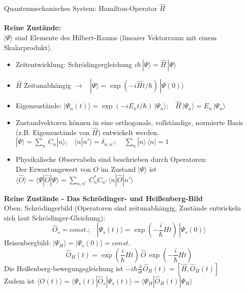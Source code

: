 \documentclass[a4paper,11pt]{scrartcl}
\begin{document}
Quantenmechanisches System: Hamilton-Operator $\hat{H}$\\
\\
\textbf{Reine Zustände:}\\
$| \Psi \rangle$ sind Elemente des Hilbert-Raums (linearer Vektorraum mit einem Skalarprodukt).\\
\begin{itemize}
 \item Zeitentwicklung: Schrödingergleichung $i \hbar \, |\Psi \rangle = \hat{H} \, | \Psi \rangle$
 \item $\hat{H}$ Zeitunabhängig $\rightarrow \,\,\,\,\, | \Psi \rangle = \exp{(-i \hat{H}t/\hbar)} \, | \Psi (0) \rangle$
 \item Eigenzustände: $| \Psi_n(t) \rangle = \exp{(-i E_n t/\hbar)}\, | \Psi_n \rangle ; \,\,\,\,\, \hat{H}\, | \Psi_n \rangle = E_n \, | \Psi_n \rangle $
 \item Zustandvektoren können in eine orthogonale, vollständige, normierte Basis (z.B. Eigenzustände von $\hat{H}$) entwickelt werden.\\
  $ | \Psi \rangle = \sum_n \, C_n |n \rangle; \,\,\,\,\, \langle n |n' \rangle =\delta_{n,n'}; \,\,\,\,\,\, \sum_n |n \rangle \, \langle n | = 1 $
 \item Physikalische Observabeln sind beschrieben durch Operatoren:\\
 Der Erwartungswert von $O$ im Zustand $| \Psi \rangle$ ist $\langle \hat{O} \rangle = \langle \Psi |\hat{O} |\Psi \rangle = \sum_{n,n'} \, C_n^* C_{n'} \, \langle n | \hat{O} | n' \rangle$
\end{itemize}
\textbf{Reine Zustände - Das Schrödinger- und Heißenberg-Bild}\\
Oben: Schrödingerbild (Operatoren sind zeitunabhängig, Zustände entwickeln sich laut Schrödinger-Gleichung):\\
\begin{equation}
 \hat{O}_s = const.; \,\,\,\,\, |\Psi_s (t) \rangle = \exp{(- \frac{i}{\hbar} H t)}\, | \Psi_s (0) \rangle
\end{equation}
Heisenbergbild: $ | \Psi_H \rangle = | \Psi_s (0) \rangle = const.$
$$\hat{O}_H (t) = \exp{(\frac{i}{\hbar} H t)} \, \hat{O} \, \exp{(-\frac{i}{\hbar} H t)}$$
Die Heißenberg-bewegungsgleichung ist $ -i \hbar \frac{\partial }{\partial t} \hat{O}_H (t) = \left[ \hat{H}, \hat{O}_H(t) \right] $\\
Zudem ist $\langle O(t) \rangle = \langle \Psi_s(t) | \hat{O}_s| \Psi_s(t) \rangle = \langle \Psi_H | \hat{O}_H(t)| \Psi_H \rangle$\\
\end{document}

